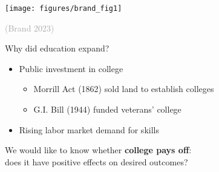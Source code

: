 \documentclass{beamer}
\newcommand\mycite[1]{\begin{scriptsize}\textcolor{darkgray}{(#1)}\end{scriptsize}}
\begin{document}
\begin{frame}

\texttt{[image: figures/brand\_fig1]}\\\hfill\mycite{Brand 2023}

\end{frame}

\begin{frame}{Why did education expand?} \pause
\begin{itemize}
\item Public investment in college
\begin{itemize}
\item Morrill Act (1862) sold land to establish colleges
\item G.I. Bill (1944) funded veterans' college
\end{itemize} \pause
\item Rising labor market demand for skills
\end{itemize}
\end{frame}

\begin{frame}

We would like to know whether \textbf{college pays off}:\\
does it have positive effects on desired outcomes?

\end{frame}
\end{document}
